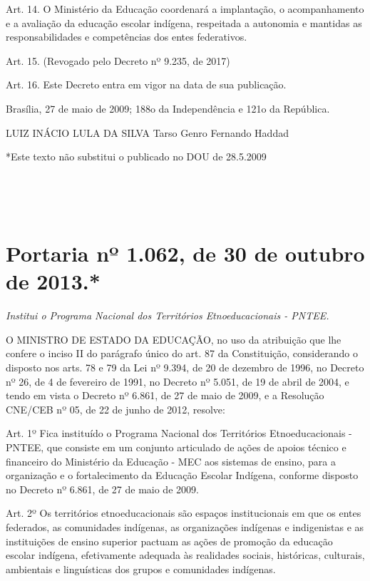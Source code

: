 \documentclass[
]{book}
\begin{document}
Art. 14. O Ministério da Educação coordenará a implantação, o acompanhamento e a avaliação da educação escolar indígena, respeitada a autonomia e mantidas as responsabilidades e competências dos entes federativos.

Art. 15. (Revogado pelo Decreto nº 9.235, de 2017)

Art. 16. Este Decreto entra em vigor na data de sua publicação.

Brasília, 27 de maio de 2009; 188o da Independência e 121o da República.

LUIZ INÁCIO LULA DA SILVA
Tarso Genro
Fernando Haddad

*Este texto não substitui o publicado no DOU de 28.5.2009

~

~

\hypertarget{portaria-nuxba-1.062-de-30-de-outubro-de-2013.}{%
\section{Portaria nº 1.062, de 30 de outubro de 2013.*}\label{portaria-nuxba-1.062-de-30-de-outubro-de-2013.}}

\emph{Institui o Programa Nacional dos Territórios Etnoeducacionais - PNTEE.}

O MINISTRO DE ESTADO DA EDUCAÇÃO, no uso da atribuição que lhe confere o inciso II do parágrafo único do art. 87 da Constituição, considerando o disposto nos arts. 78 e 79 da Lei nº 9.394, de 20 de dezembro de 1996, no Decreto nº 26, de 4 de fevereiro de 1991, no Decreto nº 5.051, de 19 de abril de 2004, e tendo em vista o Decreto nº 6.861, de 27 de maio de 2009, e a Resolução CNE/CEB nº 05, de 22 de junho de 2012, resolve:

Art. 1º Fica instituído o Programa Nacional dos Territórios Etnoeducacionais - PNTEE, que consiste em um conjunto articulado de ações de apoios técnico e financeiro do Ministério da Educação - MEC aos sistemas de ensino, para a organização e o fortalecimento da Educação Escolar Indígena, conforme disposto no Decreto nº 6.861, de 27 de maio de 2009.

Art. 2º Os territórios etnoeducacionais são espaços institucionais em que os entes federados, as comunidades indígenas, as organizações indígenas e indigenistas e as instituições de ensino superior pactuam as ações de promoção da educação escolar indígena, efetivamente adequada às realidades sociais, históricas, culturais, ambientais e linguísticas dos grupos e comunidades indígenas.
\end{document}
